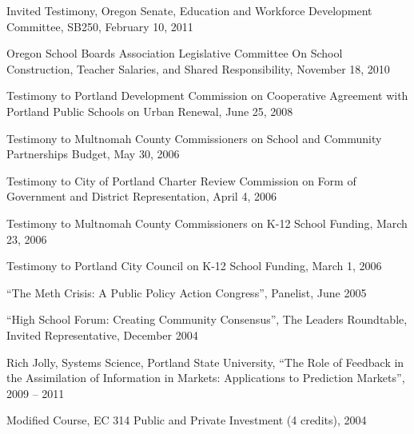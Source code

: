\documentclass[Computer Science]{vita}
\begin{document}
\begin{vita}
\begin{Selected Community Outreach}
\item Invited Testimony, Oregon Senate, Education and Workforce Development Committee, SB250, February 10, 2011 
  
\item Oregon School Boards Association Legislative Committee On School Construction, Teacher Salaries, and Shared Responsibility, November 18, 2010   

  \item Testimony to Portland Development Commission on Cooperative
    Agreement with Portland Public Schools on Urban Renewal, June 25,
    2008

  \item Testimony to Multnomah County Commissioners on School and
    Community Partnerships Budget, May 30, 2006

  \item Testimony to City of Portland Charter Review Commission on
    Form of Government and District Representation, April 4, 2006

  \item Testimony to Multnomah County Commissioners on K-12 School
    Funding, March 23, 2006

  \item Testimony to Portland City Council on K-12 School Funding,
    March 1, 2006

  \item ``The Meth Crisis: A Public Policy Action Congress'',
    Panelist, June 2005

  \item ``High School Forum: Creating Community Consensus'', The
    Leaders Roundtable, Invited Representative, December 2004
  \end{Selected Community Outreach}

  \begin{Selected Instructional Activities}
   
    \begin{Ph.D. Thesis Committee}
    \item Rich Jolly, Systems Science, Portland State University,
      ``The Role of Feedback in the Assimilation of Information in
      Markets: Applications to Prediction Markets'', 2009 -- 2011

    \end{Ph.D. Thesis Committee}

   
    \begin{Curriculum Development}
    \item Modified Course, EC 314 Public and Private Investment (4
      credits), 2004
    \end{Curriculum Development}


\end{Selected Instructional Activities}
\end{vita}
\end{document}
